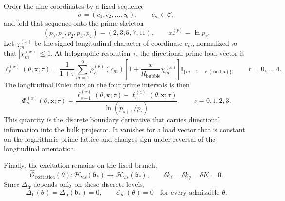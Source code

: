 Order the nine coordinates by a fixed sequence
\begin{equation}
  \sigma
  =
  (c_1,c_2,\ldots,c_9),
  \qquad
  c_m\in\mathcal C,
  \label{eq:ordered-visible-sequence}
\end{equation}
and fold that sequence onto the prime skeleton
\begin{equation}
  (p_0,p_1,p_2,p_3,p_4)
  =
  (2,3,5,7,11),
  \qquad
  x_r^{(p)}
  =
  \ln p_r.
  \label{eq:prime-skeleton}
\end{equation}
Let \(\chi_m^{(x)}\) be the signed longitudinal character of coordinate \(c_m\), normalized so that \(|\chi_m^{(x)}|\leq1\).  At holographic resolution \(\tau\), the directional prime-load vector is
\begin{equation}
  \ell_r^{(x)}(\theta,\boldsymbol{x};\tau)
  =
  \frac{1}{1+\tau}
  \sum_{m=1}^{9}
  \rho_E^{(\theta)}(c_m)
  \left[
    1+
    \frac{x}{R_{\mathrm{bubble}}}
    \chi_m^{(x)}
  \right]
  \mathbb I_{\{m-1\equiv r\;(\mathrm{mod}\;5)\}},
  \qquad
  r=0,\ldots,4.
  \label{eq:directional-prime-load}
\end{equation}
The longitudinal Euler flux on the four prime intervals is then
\begin{equation}
  \Phi_s^{(x)}(\theta,\boldsymbol{x};\tau)
  =
  \frac{
    \ell_{s+1}^{(x)}(\theta,\boldsymbol{x};\tau)
    -
    \ell_s^{(x)}(\theta,\boldsymbol{x};\tau)
  }{
    \ln(p_{s+1}/p_s)
  },
  \qquad
  s=0,1,2,3.
  \label{eq:directional-entropy-shear}
\end{equation}
This quantity is the discrete boundary derivative that carries directional information into the bulk projector.  It vanishes for a load vector that is constant on the logarithmic prime lattice and changes sign under reversal of the longitudinal orientation.

Finally, the excitation remains on the fixed branch,
\begin{equation}
  \widehat{\mathcal O}_{\mathrm{excitation}}(\theta):
  \mathcal H_{\mathrm{vis}}(\mathfrak b_*)
  \longrightarrow
  \mathcal H_{\mathrm{vis}}(\mathfrak b_*),
  \qquad
  \delta k_\ell
  =
  \delta k_q
  =
  \delta K
  =
  0.
  \label{eq:branch-preserving-excitation}
\end{equation}
Since \(\Delta_{\mathrm{fr}}\) depends only on these discrete levels,
\begin{equation}
  \Delta_{\mathrm{fr}}(\theta)
  =
  \Delta_{\mathrm{fr}}(\mathfrak b_*)
  =
  0,
  \qquad
  \mathcal E_{\mu\nu}(\theta)
  =
  0
  \quad
  \text{for every admissible }\theta.
  \label{eq:framing-preserved-under-excitation}
\end{equation}